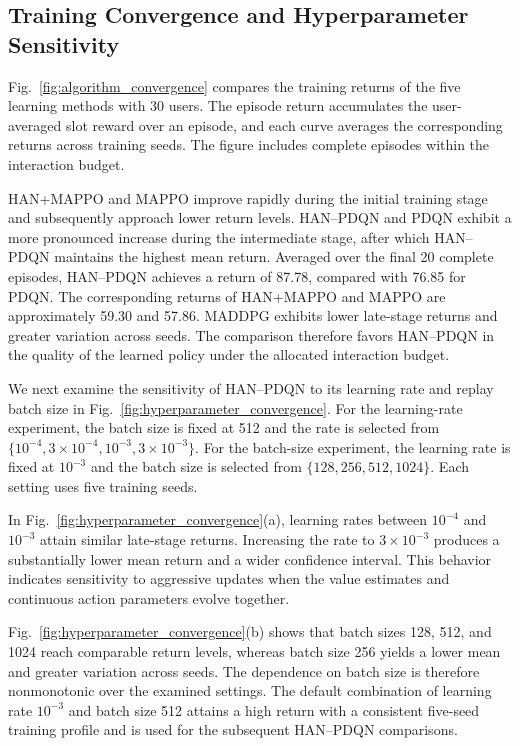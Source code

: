 \documentclass[journal]{IEEEtran}
\begin{document}
\subsection{Training Convergence and Hyperparameter Sensitivity}
\label{subsec:training_performance}

Fig.~\ref{fig:algorithm_convergence} compares the training
returns of the five learning methods with 30 users.
The episode return accumulates the user-averaged slot
reward over an episode, and each curve averages the
corresponding returns across training seeds.
The figure includes complete episodes within the
interaction budget.

HAN+MAPPO and MAPPO improve rapidly during the initial
training stage and subsequently approach lower return
levels. HAN--PDQN and PDQN exhibit a more pronounced
increase during the intermediate stage, after which
HAN--PDQN maintains the highest mean return.
Averaged over the final 20 complete episodes,
HAN--PDQN achieves a return of 87.78, compared with
76.85 for PDQN. The corresponding returns of HAN+MAPPO
and MAPPO are approximately 59.30 and 57.86.
MADDPG exhibits lower late-stage returns and greater
variation across seeds.
The comparison therefore favors HAN--PDQN in the
quality of the learned policy under the allocated
interaction budget.

We next examine the sensitivity of HAN--PDQN to its
learning rate and replay batch size in
Fig.~\ref{fig:hyperparameter_convergence}.
For the learning-rate experiment, the batch size is
fixed at 512 and the rate is selected from
$\{10^{-4},3\times10^{-4},10^{-3},3\times10^{-3}\}$.
For the batch-size experiment, the learning rate is
fixed at $10^{-3}$ and the batch size is selected from
$\{128,256,512,1024\}$.
Each setting uses five training seeds.

In Fig.~\ref{fig:hyperparameter_convergence}(a), learning
rates between $10^{-4}$ and $10^{-3}$ attain similar
late-stage returns. Increasing the rate to
$3\times10^{-3}$ produces a substantially lower mean
return and a wider confidence interval.
This behavior indicates sensitivity to aggressive
updates when the value estimates and continuous
action parameters evolve together.

Fig.~\ref{fig:hyperparameter_convergence}(b) shows that
batch sizes 128, 512, and 1024 reach comparable return
levels, whereas batch size 256 yields a lower mean
and greater variation across seeds.
The dependence on batch size is therefore nonmonotonic
over the examined settings.
The default combination of learning rate $10^{-3}$
and batch size 512 attains a high return with a
consistent five-seed training profile and is used
for the subsequent HAN--PDQN comparisons.
\end{document}
